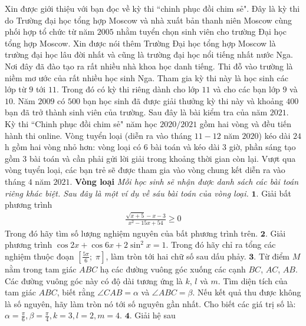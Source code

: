 \begin{multicols}{2}
	Xin được giới thiệu với bạn đọc về kỳ thi ``chinh phục đồi chim sẻ". Đây là kỳ thi do Trường đại học tổng hợp Moscow và nhà xuất bản thanh niên Moscow cùng phối hợp tổ chức từ năm $2005$ nhằm tuyển chọn sinh viên cho trường Đại học tổng hợp Moscow. Xin được nói thêm Trường Đại học tổng hợp Moscow là trường đại học lâu đời nhất và cũng là trường đại học nổi tiếng nhất nước Nga. Nơi đây đã đào tạo ra rất nhiều nhà khoa học danh tiếng. Thi đỗ vào trường là niềm mơ ước của rất nhiều học sinh Nga. Tham gia kỳ thi này là học sinh các lớp từ $9$ tới $11$. Trong đó có kỳ thi riêng dành cho lớp $11$ và cho các bạn lớp $9$ và $10$. Năm $2009$ có $500$ bạn học sinh đã được giải thưởng kỳ thi này và khoảng $400$ bạn đã trở thành sinh viên của trường. Sau đây là bài kiểm tra của năm $2021$.
	\vskip 0.1cm
	Kỳ thi ``Chinh phục đồi chim sẻ" năm học $2020/2021$ gồm hai vòng và đều tiến hành thi online. Vòng tuyển loại (diễn ra vào tháng $11-12$ năm $2020$) kéo dài $24$h gồm hai vòng nhỏ hơn: vòng loại có $6$ bài toán và kéo dài $3$ giờ, phần sáng tạo gồm $3$ bài toán và cần phải gửi lời giải trong khoảng thời gian còn lại. Vượt qua vòng tuyển loại, các bạn trẻ sẽ được tham gia vào vòng chung kết diễn ra vào tháng $4$ năm $2021$.
	\vskip 0.1cm
	\textbf{\color{cackithi}Vòng loại}
	\vskip 0.1cm
	\textit{Mỗi học sinh sẽ nhận được danh sách các bài toán riêng khác biệt. Sau đây là một ví dụ về sáu bài toán của vòng loại.}
	\vskip 0.1cm
	$\pmb{1.}$ Giải bất phương trình
	\setlength{\abovedisplayskip}{5pt}
	\setlength{\belowdisplayskip}{5pt}
	\begin{align*}
		\frac{{\sqrt {x + 5}  - x - 3}}{{{x^2} - 15x + 54}} \ge 0
	\end{align*}
	Trong đó hãy tìm số lượng nghiệm nguyên của bất phương trình trên.
	\vskip 0.1cm
	$\pmb{2.}$ Giải phương trình $\cos 2x + \cos 6x + 2\sin^2 x = 1$.
	\vskip 0.1cm
	Trong đó hãy chỉ ra tổng các nghiệm thuộc đoạn $\left[ {\frac{{5\pi }}{6};\;\pi } \right]$, làm tròn tới hai chữ số sau dấu phảy.
	\vskip 0.1cm
	$\pmb{3.}$ Từ điểm $M$ nằm trong tam giác $ABC$ hạ các đường vuông góc xuống các cạnh $BC$, $AC$, $AB$. Các đường vuông góc này có độ dài tương ứng là $k$, $l$ và $m$. Tìm diện tích của tam giác $ABC$, biết rằng $\angle CAB = \alpha$ và  $\angle ABC = \beta$. Nếu kết quả thu được không là số nguyên, hãy làm tròn nó tới số nguyên gần nhất.
	\vskip 0.1cm
	Cho biết các giá trị số là:  $\alpha = \frac{\pi}{6}, \beta = \frac{\pi}{4},k=3  ,l=2  ,m=4$.
	\vskip 0.1cm 
	$\pmb{4.}$ Giải hệ sau
	\begin{align*}

\end{align*}
\end{multicols}
